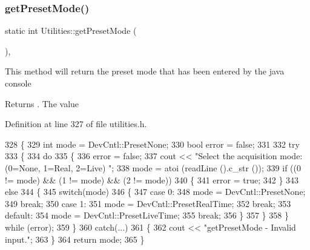\subsubsection{\texorpdfstring{get\+Preset\+Mode()}{getPresetMode()}}
{\footnotesize\ttfamily static int Utilities\+::get\+Preset\+Mode (\begin{DoxyParamCaption}{ }\end{DoxyParamCaption})\hspace{0.3cm}{\ttfamily [inline]}, {\ttfamily [static]}}

This method will return the preset mode that has been entered by the java console \begin{DoxyReturn}{Returns}
. The value 
\end{DoxyReturn}


Definition at line 327 of file utilities.\+h.


\begin{DoxyCode}
328     \{
329         \textcolor{keywordtype}{int} mode = DevCntl::PresetNone;
330         \textcolor{keywordtype}{bool} error = \textcolor{keyword}{false};
331         
332         \textcolor{keywordflow}{try} 
333         \{
334             \textcolor{keywordflow}{do} 
335             \{
336                 error = \textcolor{keyword}{false};
337                 cout << \textcolor{stringliteral}{"Select the acquisition mode: (0=None, 1=Real, 2=Live) "};
338                 mode = atoi (readLine ().c\_str ());
339                 \textcolor{keywordflow}{if} ((0 != mode) && (1 != mode) && (2 != mode))
340                 \{
341                     error = \textcolor{keyword}{true};
342                 \}
343                 \textcolor{keywordflow}{else} 
344                 \{
345                     \textcolor{keywordflow}{switch}(mode) 
346                     \{
347                     \textcolor{keywordflow}{case} 0:
348                         mode = DevCntl::PresetNone;
349                         \textcolor{keywordflow}{break};
350                     \textcolor{keywordflow}{case} 1:
351                         mode = DevCntl::PresetRealTime;
352                         \textcolor{keywordflow}{break};
353                     \textcolor{keywordflow}{default}:
354                         mode = DevCntl::PresetLiveTime;
355                         \textcolor{keywordflow}{break};
356                     \}
357                 \}
358             \} \textcolor{keywordflow}{while} (error);
359         \}
360         \textcolor{keywordflow}{catch}(...) 
361         \{
362             cout << \textcolor{stringliteral}{"getPresetMode - Invalid input."};
363         \}
364         \textcolor{keywordflow}{return} mode;
365     \}
\end{DoxyCode}
\mbox{\label{class_utilities_a9cf757f567c9521f6d9867e36db3390a_a9cf757f567c9521f6d9867e36db3390a}} 
